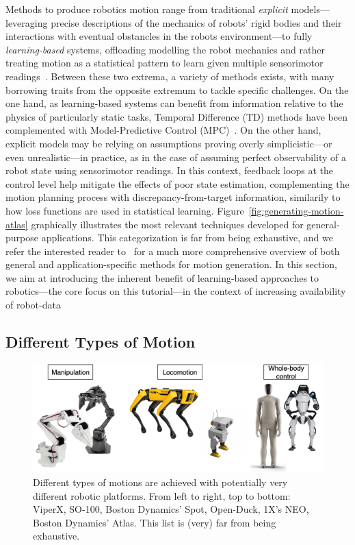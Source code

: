 Methods to produce robotics motion range from traditional \emph{explicit} models---leveraging precise descriptions of the mechanics of robots' rigid bodies and their interactions with eventual obstancles in the robots environment---to fully \emph{learning-based} systems, offloading modelling the robot mechanics and rather treating motion as a statistical pattern to learn given multiple sensorimotor readings~\citep{bekrisStateRobotMotion2024}.
Between these two extrema, a variety of methods exists, with many borrowing traits from the opposite extremum to tackle specific challenges.
On the one hand, as learning-based systems can benefit from information relative to the physics of particularly static tasks, Temporal Difference (TD) methods have been complemented with Model-Predictive Control (MPC)~\citep{hansenTemporalDifferenceLearning2022}.
On the other hand, explicit models may be relying on assumptions proving overly simplicistic---or even unrealistic---in practice, as in the case of assuming perfect observability of a robot state using sensorimotor readings. In this context, feedback loops at the control level help mitigate the effects of poor state estimation, complementing the motion planning process with discrepancy-from-target information, similarily to how loss functions are used in statistical learning.
Figure~\ref{fig:generating-motion-atlas} graphically illustrates the most relevant techniques developed for general-purpose applications.
This categorization is far from being exhaustive, and we refer the interested reader to~\citet{bekrisStateRobotMotion2024} for a much more comprehensive overview of both general and application-specific methods for motion generation.
In this section, we aim at introducing the inherent benefit of learning-based approaches to robotics---the core focus on this tutorial---in the context of increasing availability of robot-data

\subsection{Different Types of Motion}

\begin{figure}
    \centering
    \includegraphics[width=0.7\linewidth]{figures/ch2/ch2-platforms.png}
    \caption{Different types of motions are achieved with potentially very different robotic platforms. From left to right, top to bottom: ViperX, SO-100, Boston Dynamics' Spot, Open-Duck, 1X's NEO, Boston Dynamics' Atlas. This list is (very) far from being exhaustive.}
    \label{fig:robotics-platforms-atlas}
\end{figure}

